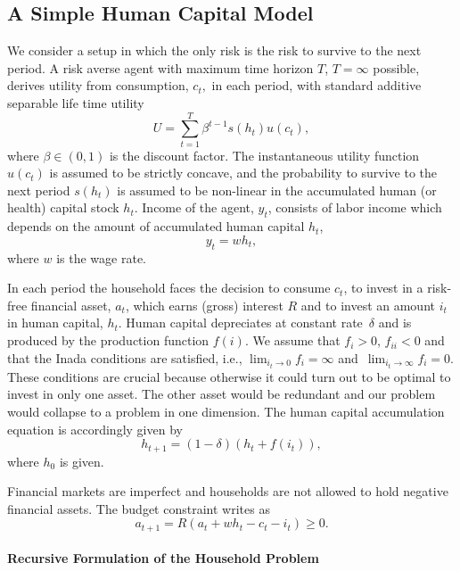 \documentclass[a4paper,12pt]{article}%
\begin{document}
\subsection{A Simple Human Capital Model}

\label{ss:simplehkmodel}

We consider a setup in which the only risk is the risk to survive to the next
period. A risk averse agent with maximum time horizon $T$, $T=\infty$
possible, derives utility from consumption, $c_{t},$ in each period, with
standard additive separable life time utility
\[
U=\sum_{t=1}^{T}\beta^{t-1}s\left(  h_{t}\right)  u\left(  c_{t}\right)  ,
\]
where $\beta\in\left(  0,1\right)  $ is the discount factor. The instantaneous
utility function~$u\left(  c_{t}\right)  $ is assumed to be strictly concave,
and the probability to survive to the next period $s\left(  h_{t}\right)  $ is
assumed to be non-linear in the accumulated human (or health) capital stock
$h_{t}$. Income of the agent, $y_{t}$, consists of labor income which depends
on the amount of accumulated human capital $h_{t}$,
\[
y_{t}=wh_{t},
\]
where $w$ is the wage rate.

In each period the household faces the decision to consume $c_{t}$, to invest
in a risk-free financial asset, $a_{t}$, which earns (gross) interest $R$ and
to invest an amount $i_{t}$ in human capital, $h_{t}$. Human capital
depreciates at constant rate~$\delta$ and is produced by the production
function $f\left(  i\right)  $. We assume that $f_{i}>0$, $f_{ii}<0$ and that
the Inada conditions are satisfied, i.e., $\lim_{i_{t}\rightarrow0}%
f_{i}=\infty$ and~$\lim_{i_{t}\rightarrow\infty}f_{i}=0$. These conditions are
crucial because otherwise it could turn out to be optimal to invest in only
one asset. The other asset would be redundant and our problem would collapse
to a problem in one dimension. The human capital accumulation equation is
accordingly given by
\begin{equation}
h_{t+1}=(1-\delta)\left(  h_{t}+f\left(  i_{t}\right)  \right)  ,
\label{eq:hkaccum}%
\end{equation}
where $h_{0}$ is given.

Financial markets are imperfect and households are not allowed to hold
negative financial assets. The budget constraint writes as
\[
a_{t+1} = R(a_{t} + w h_{t} - c_{t} - i_{t}) \geq0.
\]


\paragraph{Recursive Formulation of the Household Problem}
\end{document}
